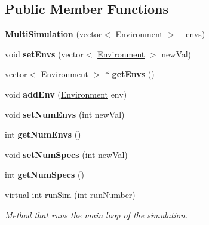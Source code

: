 \subsection*{Public Member Functions}
\begin{DoxyCompactItemize}
\item 
\mbox{\label{classMultiSimulation_ad51e5bcf883518c3c817f4d82227f294}} 
{\bfseries Multi\+Simulation} (vector$<$ \hyperlink{classEnvironment}{Environment} $>$ \+\_\+envs)
\item 
\mbox{\label{classMultiSimulation_a04d145935482000983a462bc59ade87c}} 
void {\bfseries set\+Envs} (vector$<$ \hyperlink{classEnvironment}{Environment} $>$ new\+Val)
\item 
\mbox{\label{classMultiSimulation_a1ad17e4add05c03fe3719aac54c5d0c3}} 
vector$<$ \hyperlink{classEnvironment}{Environment} $>$ $\ast$ {\bfseries get\+Envs} ()
\item 
\mbox{\label{classMultiSimulation_a445549476e87656b6f153c6e09764b2b}} 
void {\bfseries add\+Env} (\hyperlink{classEnvironment}{Environment} env)
\item 
\mbox{\label{classMultiSimulation_a589d57167ba82ab6a1d43e49001c669f}} 
void {\bfseries set\+Num\+Envs} (int new\+Val)
\item 
\mbox{\label{classMultiSimulation_a357f60562b2907933dc92638a0fae83b}} 
int {\bfseries get\+Num\+Envs} ()
\item 
\mbox{\label{classMultiSimulation_a3ae04feb1bf9bae33bf1ed239ff02203}} 
void {\bfseries set\+Num\+Specs} (int new\+Val)
\item 
\mbox{\label{classMultiSimulation_a2e2c2af3cb981335e92bbeb94c56a382}} 
int {\bfseries get\+Num\+Specs} ()
\item 
virtual int \hyperlink{classMultiSimulation_a235347d04fd0c7e1a2e35d7a39e77583}{run\+Sim} (int run\+Number)
\begin{DoxyCompactList}\small\item\em Method that runs the main loop of the simulation. \end{DoxyCompactList}\end{DoxyCompactItemize}
